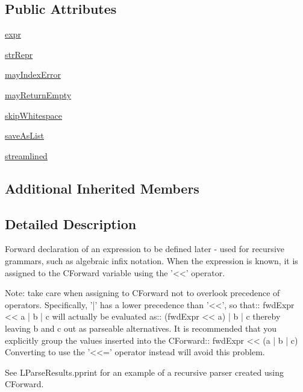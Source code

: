 \subsection*{Public Attributes}
\begin{DoxyCompactItemize}
\item 
\hyperlink{classsetuptools_1_1__vendor_1_1pyparsing_1_1Forward_a159a0ef6fccd6776df20923161748478}{expr}
\item 
\hyperlink{classsetuptools_1_1__vendor_1_1pyparsing_1_1Forward_ad66d918d824383a59eb3e18c2c454b67}{str\+Repr}
\item 
\hyperlink{classsetuptools_1_1__vendor_1_1pyparsing_1_1Forward_a9643389ffa33fc42ceba3e3abc1a58c0}{may\+Index\+Error}
\item 
\hyperlink{classsetuptools_1_1__vendor_1_1pyparsing_1_1Forward_aecdbb781823828da570a5ac6b7b605e5}{may\+Return\+Empty}
\item 
\hyperlink{classsetuptools_1_1__vendor_1_1pyparsing_1_1Forward_aa5fc81471fce221d3df106be0e05572c}{skip\+Whitespace}
\item 
\hyperlink{classsetuptools_1_1__vendor_1_1pyparsing_1_1Forward_a7bd0017c92cb1ec61d18ea9d7b656ffd}{save\+As\+List}
\item 
\hyperlink{classsetuptools_1_1__vendor_1_1pyparsing_1_1Forward_a00fb86e8b428a2db455187abb6f86100}{streamlined}
\end{DoxyCompactItemize}
\subsection*{Additional Inherited Members}


\subsection{Detailed Description}
\begin{DoxyVerb}Forward declaration of an expression to be defined later -
used for recursive grammars, such as algebraic infix notation.
When the expression is known, it is assigned to the C{Forward} variable using the '<<' operator.

Note: take care when assigning to C{Forward} not to overlook precedence of operators.
Specifically, '|' has a lower precedence than '<<', so that::
    fwdExpr << a | b | c
will actually be evaluated as::
    (fwdExpr << a) | b | c
thereby leaving b and c out as parseable alternatives.  It is recommended that you
explicitly group the values inserted into the C{Forward}::
    fwdExpr << (a | b | c)
Converting to use the '<<=' operator instead will avoid this problem.

See L{ParseResults.pprint} for an example of a recursive parser created using
C{Forward}.
\end{DoxyVerb}
 

